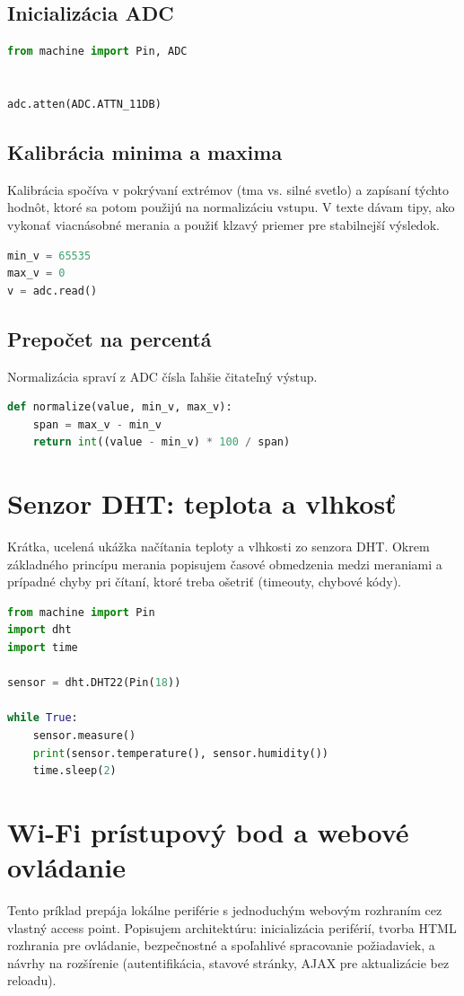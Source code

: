 \subsection*{Inicializácia ADC}
\begin{lstlisting}[language=Python]
from machine import Pin, ADC


adc.atten(ADC.ATTN_11DB)
\end{lstlisting}

\subsection*{Kalibrácia minima a maxima}
Kalibrácia spočíva v pokrývaní extrémov (tma vs. silné svetlo) a zapísaní týchto hodnôt, ktoré sa potom použijú na normalizáciu vstupu. V texte dávam tipy, ako vykonať viacnásobné merania a použiť klzavý priemer pre stabilnejší výsledok.
\begin{lstlisting}[language=Python]
min_v = 65535
max_v = 0
v = adc.read()
\end{lstlisting}

\subsection*{Prepočet na percentá}
Normalizácia spraví z ADC čísla ľahšie čitateľný výstup.
\begin{lstlisting}[language=Python]
def normalize(value, min_v, max_v):
	span = max_v - min_v
	return int((value - min_v) * 100 / span)
\end{lstlisting}

\clearpage
\section{Senzor DHT: teplota a vlhkosť}
Krátka, ucelená ukážka načítania teploty a vlhkosti zo senzora DHT. Okrem základného princípu merania popisujem časové obmedzenia medzi meraniami a prípadné chyby pri čítaní, ktoré treba ošetriť (timeouty, chybové kódy).

\begin{lstlisting}[language=Python]
from machine import Pin
import dht
import time

sensor = dht.DHT22(Pin(18))

while True:
	sensor.measure()
	print(sensor.temperature(), sensor.humidity())
	time.sleep(2)
\end{lstlisting}

\clearpage
\section{Wi-Fi prístupový bod a webové ovládanie}
Tento príklad prepája lokálne periférie s jednoduchým webovým rozhraním cez vlastný access point. Popisujem architektúru: inicializácia periférií, tvorba HTML rozhrania pre ovládanie, bezpečnostné a spoľahlivé spracovanie požiadaviek, a návrhy na rozšírenie (autentifikácia, stavové stránky, AJAX pre aktualizácie bez reloadu).

